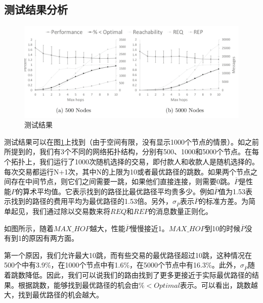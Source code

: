 \documentclass[12pt,a4paper]{article}
\begin{document}
\subsection{测试结果分析}

\begin{figure}[htb]
\centering
\includegraphics[width=14cm]{image-20181127161041797}
\caption{\label{image-20181127161041797} 测试结果}
\end{figure}

测试结果可以在图\ref{image-20181127161041797}上找到（由于空间有限，没有显示1000个节点的情景）。如之前所提到的，我们有3个不同的网络拓扑结构，分别有500、1000和5000个节点。在每个拓扑上，我们运行了1000次随机选择的交易，即付款人和收款人是随机选择的。每次交易都运行N+1次，其中N的上限为10或者最优路径的跳数。如果两个节点之间存在中间节点，则它们之间需要一跳，如果他们直接连接，则需要0跳。$\overline P$是性能$P$的算术平均值。它表示找到的路径比最优路径平均贵多少。例如$\overline P$值为1.53表示找到的路径的费用平均为最优路径的1.53倍。另外，$\sigma_{\overline P}$表示$\overline P$的标准方差。为简单起见，我们通过除以交易数来将$REQ$和$REP$的消息数量正则化。

如图所示，随着$MAX\_HOP$越大，性能$\overline P$慢慢接近1。$MAX\_HOP$到10的时候$\overline P$没有到1的原因有两方面。

第一个原因，我们允许最大10跳，而有些交易的最优路径超过10跳，这种情况在 500个中有3.9\%，在1000个节点中有1.6\%，在5000个节点中有16.3\%。此外，$\sigma_{\overline P}$随着跳数降低。因此，我们可以说我们的路由找到了更多更接近于实际最优路径的结果。根据跳数，能够找到最优路径的机会由$\%<Optimal$表示。可以看出，跳数越大，找到最优路径的机会越大。
\end{document}
